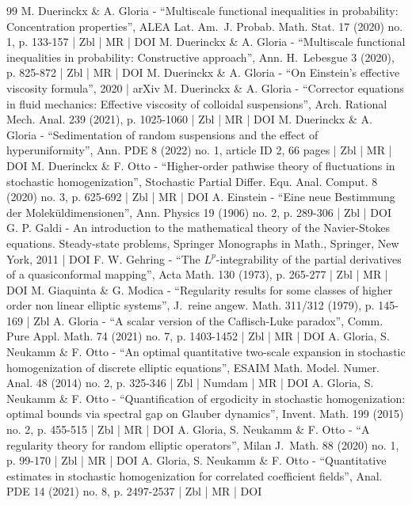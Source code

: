 \begin{thebibliography}{99}
M. Duerinckx \& A. Gloria - “Multiscale functional inequalities in probability: Concentration properties”, ALEA Lat. Am. J. Probab. Math. Stat. 17 (2020) no. 1, p. 133-157 | Zbl | MR | DOI
M. Duerinckx \& A. Gloria - “Multiscale functional inequalities in probability: Constructive approach”, Ann. H. Lebesgue 3 (2020), p. 825-872 | Zbl | MR | DOI
M. Duerinckx \& A. Gloria - “On Einstein’s effective viscosity formula”, 2020 | arXiv
M. Duerinckx \& A. Gloria - “Corrector equations in fluid mechanics: Effective viscosity of colloidal suspensions”, Arch. Rational Mech. Anal. 239 (2021), p. 1025-1060 | Zbl | MR | DOI
M. Duerinckx \& A. Gloria - “Sedimentation of random suspensions and the effect of hyperuniformity”, Ann. PDE 8 (2022) no. 1, article ID 2, 66 pages | Zbl | MR | DOI
M. Duerinckx \& F. Otto - “Higher-order pathwise theory of fluctuations in stochastic homogenization”, Stochastic Partial Differ. Equ. Anal. Comput. 8 (2020) no. 3, p. 625-692 | Zbl | MR | DOI
A. Einstein - “Eine neue Bestimmung der Moleküldimensionen”, Ann. Physics 19 (1906) no. 2, p. 289-306 | Zbl | DOI
G. P. Galdi - An introduction to the mathematical theory of the Navier-Stokes equations. Steady-state problems, Springer Monographs in Math., Springer, New York, 2011 | DOI
F. W. Gehring - “The $L^p$-integrability of the partial derivatives of a quasiconformal mapping”, Acta Math. 130 (1973), p. 265-277 | Zbl | MR | DOI
M. Giaquinta \& G. Modica - “Regularity results for some classes of higher order non linear elliptic systems”, J. reine angew. Math. 311/312 (1979), p. 145-169 | Zbl
A. Gloria - “A scalar version of the Caflisch-Luke paradox”, Comm. Pure Appl. Math. 74 (2021) no. 7, p. 1403-1452 | Zbl | MR | DOI
A. Gloria, S. Neukamm \& F. Otto - “An optimal quantitative two-scale expansion in stochastic homogenization of discrete elliptic equations”, ESAIM Math. Model. Numer. Anal. 48 (2014) no. 2, p. 325-346 | Zbl | Numdam | MR | DOI
A. Gloria, S. Neukamm \& F. Otto - “Quantification of ergodicity in stochastic homogenization: optimal bounds via spectral gap on Glauber dynamics”, Invent. Math. 199 (2015) no. 2, p. 455-515 | Zbl | MR | DOI
A. Gloria, S. Neukamm \& F. Otto - “A regularity theory for random elliptic operators”, Milan J. Math. 88 (2020) no. 1, p. 99-170 | Zbl | MR | DOI
A. Gloria, S. Neukamm \& F. Otto - “Quantitative estimates in stochastic homogenization for correlated coefficient fields”, Anal. PDE 14 (2021) no. 8, p. 2497-2537 | Zbl | MR | DOI

\end{thebibliography}
